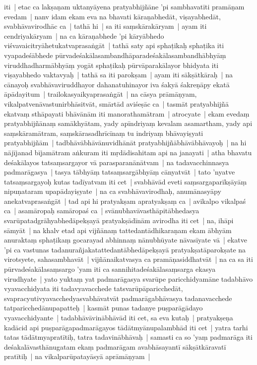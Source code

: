 \documentclass[article,12pt,a4paper]{memoir}%
\begin{document}
	  
	  \pstart \leavevmode%
	iti | etac ca lakṣaṇam uktanyāyena pratyabhijñāne 'pi sambhavatīti pramāṇam evedam | \label{thakur75-113.14} nanv idam ekam eva na bhavati kāraṇabhedāt, viṣayabhedāt, svabhāvavirodhāc ca | \label{thakur75-113.14a} tathā hi | sa iti saṃskārakāryam | ayam iti cendriyakāryam | na ca kāraṇabhede 'pi kāryābhedo viśvavaicitryāhetukatvaprasaṅgāt | \label{thakur75-113.16} tathā saty api sphaṭikaḥ sphaṭika iti vyapadeśābhede pūrvadeśakālasambandhāparadeśakālasambandhābhyāṃ viruddhadharmābhyāṃ yogāt sphaṭikaḥ pūrvāparakālayor bhidyata iti viṣayabhedo vaktavyaḥ | \label{thakur75-113.18} tathā sa iti parokṣam | ayam iti sākṣātkāraḥ | na cānayoḥ svabhāvaviruddhayor dahanatuhinayor iva śakyā śakreṇāpy ekatā āpādayitum | trailokasyaikyaprasaṅgāt | \label{thakur75-113.20} na cāsya prāmāṇyam, vikalpatvenāvastunirbhāsitvāt, smārtād aviśeṣāc ca | tasmāt pratyabhijñā ekatvaṃ sthāpayati bhāvānām iti manorathamātram | \label{thakur75-113.23} atrocyate | ekam evedaṃ pratyabhijñānaṃ samākhyātam, \label{thakur75-113.23a} yady apīndriyaṃ kevalam asamartham, yady api saṃskāramātram, saṃskārasadhrīcīnaṃ tu indriyaṃ bhāvayiṣyati pratyabhijñām | tadbhāvābhāvānuvidhānāt pratyabhijñābhāvābhāvayoḥ | na hi nājījanad bījamātram aṅkuram iti mṛdādisahitam api na janayati | \label{thakur75-113.26} atha bhavatu deśakālayos tatsaṃsargayor vā parasparanānātvam | na tadavacchinnasya padmarāgasya | tasya tābhyāṃ tatsaṃsargābhyāṃ cānyatvāt | \label{thakur75-113.29} tato 'nyatve tatsaṃsargayoḥ kutas tadīyatvam iti cet | svabhāvād eveti saṃsargaparīkṣāyāṃ nipuṇataram upapādayiṣyate | \label{thakur75-113.30} na ca svabhāvavirodhaḥ, anumānasyāpy anekatvaprasaṅgāt | tad api hi pratyakṣam apratyakṣaṃ ca | avikalpo vikalpaś ca | asamāropaḥ samāropaś ca | \label{thakur75-113.32} svānubhavāvasthāpitābhedasya svarūpatadgrāhyabhedāpekṣayā pratyakṣādīnām avirodha iti cet | na, ihāpi sāmyāt | na khalv etad api vijñānaṃ tattedantādhikaraṇam ekam ābhyām anuraktaṃ sphaṭikaṃ gocarayad abhinnaṃ nānubhūyate nāvasīyate vā | ekatve 'pi ca vastunas tadanurañjakatattedantābhedāpekṣayā pratyakṣatāparokṣate na virotsyete, sahasambhavāt | vijñānaikatvasya ca pramāṇasiddhatvāt | \label{thakur75-114.3} na ca sa iti pūrvadeśakālasaṃsargo 'yam iti ca sannihitadeśakālasaṃsarga ekasya virudhyate | yato yuktaṃ yat padmarāgasya svarūpe paricchidyamāne tadabhāvo vyavacchidyata iti tadavyavacchede tatsvarūpāparicchedāt, svapracyutivyavacchedyasvabhāvatvāt padmarāgabhāvasya tadanavacchede tatparicchedānupapatteḥ | \label{thakur75-114.8} kasmāt punas tadanye puṣparāgādayo vyavacchidyante | tadabhāvāvinābhāvād iti cet, sa eva kutaḥ | pratyakṣeṇa kadācid api puṣparāgapadmarāgayos tādātmyānupalambhād iti cet | yatra tarhi tatas tādātmyapratītiḥ, tatra tadavinābhāvaḥ | samasti ca so 'yaṃ padmarāga iti deśakalāvasthānugatam ekaṃ padmarāgam avabhāsayantī sākṣātkāravatī pratītiḥ | \label{thakur75-114.12} na vikalparūpatayāsyā aprāmāṇyam | 
\end{document}
